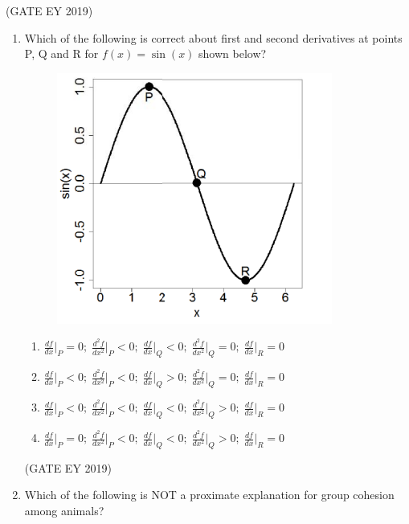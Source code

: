\documentclass[journal,12pt,onecolumn]{IEEEtran}
\theoremstyle{remark}
\begin{document}
\begin{enumerate}[resume]
\hfill{(GATE EY 2019)}


\end{enumerate}
\begin{enumerate}[resume]

\item Which of the following is correct about first and second derivatives at points P, Q and R for $f(x) = \sin(x)$ shown below?  
\begin{figure}[H]
    \centering
    \includegraphics[]{figs/30.png}
\end{figure}


\begin{enumerate}
\item  $\frac{df}{dx}\Big|_P = 0;\; \frac{d^2f}{dx^2}\Big|_P < 0;\; \frac{df}{dx}\Big|_Q < 0;\; \frac{d^2f}{dx^2}\Big|_Q = 0;\; \frac{df}{dx}\Big|_R = 0$
\item    $\frac{df}{dx}\Big|_P < 0;\; \frac{d^2f}{dx^2}\Big|_P < 0;\; \frac{df}{dx}\Big|_Q > 0;\; \frac{d^2f}{dx^2}\Big|_Q = 0;\; \frac{df}{dx}\Big|_R = 0$ 
\item  $\frac{df}{dx}\Big|_P < 0;\; \frac{d^2f}{dx^2}\Big|_P < 0;\; \frac{df}{dx}\Big|_Q < 0;\; \frac{d^2f}{dx^2}\Big|_Q > 0;\; \frac{df}{dx}\Big|_R = 0$
\item$\frac{df}{dx}\Big|_P = 0;\; \frac{d^2f}{dx^2}\Big|_P < 0;\; \frac{df}{dx}\Big|_Q < 0;\; \frac{d^2f}{dx^2}\Big|_Q > 0;\; \frac{df}{dx}\Big|_R = 0$
\end{enumerate}



\hfill{(GATE EY 2019)}
\item Which of the following is NOT a proximate explanation for group cohesion among animals?  

\begin{enumerate}
   

\end{enumerate}
\end{enumerate}
\end{document}
